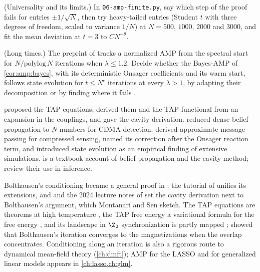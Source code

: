 \begin{refsection}
\begin{exercises}
\item \measurement (Universality and its limits.) In \texttt{06-amp-finite.py}, say which step of the proof fails for entries $\pm1/\sqrt N$, then try heavy-tailed entries (Student $t$ with three degrees of freedom, scaled to variance $1/N$) at $N=500$, $1000$, $2000$ and $3000$, and fit the mean deviation at $t=3$ to $CN^{-\theta}$.\label{ex:amp:universality}

\item \research (Long times.) The preprint of \textcite{LiWei2022} tracks a normalized AMP from the spectral start for $N/\mathrm{polylog}\,N$ iterations when $\lambda\le1.2$. Decide whether the Bayes-AMP of \cref{cor:amp:bayes}, with its deterministic Onsager coefficients and its warm start, follows state evolution for $t\le N^c$ iterations at every $\lambda>1$, by adapting their decomposition or by finding where it fails \parencite{CelentanoFanMei2023}.\label{ex:amp:long}
\end{exercises}

\notesandrefs

\textcite{ThoulessAndersonPalmer1977} proposed the TAP equations, \textcite{Plefka1982} derived them and the TAP functional from an expansion in the couplings, and \textcite{MezardParisiVirasoro1986} gave the cavity derivation. \Textcite{Kabashima2003} reduced dense belief propagation to $N$ numbers for CDMA detection; \textcite{DonohoMalekiMontanari2009} derived approximate message passing for compressed sensing, named its correction after the Onsager reaction term, and introduced state evolution as an empirical finding of extensive simulations. \Textcite{MezardMontanari2009} is a textbook account of belief propagation and the cavity method; \textcite{ZdeborovaKrzakala2016} review their use in inference.

Bolthausen's conditioning \parencite{Bolthausen2014} became a general proof in \textcite{BayatiMontanari2011}; the tutorial of \textcite{FengEtAl2022} unifies its extensions, and \textcite{MontanariSen2024} and the 2024 lecture notes of \textcite{KrzakalaZdeborova2024} set the cavity derivation next to Bolthausen's argument, which Montanari and Sen sketch. The TAP equations are theorems at high temperature \parencite{Talagrand2011a}, the TAP free energy a variational formula for the free energy \parencite{ChenPanchenko2018}, and its landscape in $\Z_2$ synchronization is partly mapped \parencite{FanMeiMontanari2021,CelentanoFanMei2023}; \textcite{ChenTang2021} showed that Bolthausen's iteration converges to the magnetizations when the overlap concentrates. Conditioning along an iteration is also a rigorous route to dynamical mean-field theory (\cref{ch:dmft}); AMP for the LASSO and for generalized linear models appears in \cref{ch:lasso,ch:glm}.


\end{refsection}
